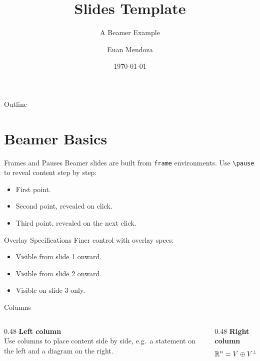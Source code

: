 \documentclass{beamer}
\title{Slides Template}
\subtitle{A Beamer Example}
\author{Euan Mendoza}
\date{\today}
\begin{document}
\begin{frame}
    \titlepage
\end{frame}

\begin{frame}{Outline}
    \tableofcontents
\end{frame}

\section{Beamer Basics}

\begin{frame}{Frames and Pauses}
    Beamer slides are built from \texttt{frame} environments.
    Use \texttt{\textbackslash pause} to reveal content step by step:

    \begin{itemize}
        \item First point.
        \pause
        \item Second point, revealed on click.
        \pause
        \item Third point, revealed on the next click.
    \end{itemize}
\end{frame}

\begin{frame}{Overlay Specifications}
    Finer control with overlay specs:

    \begin{itemize}
        \item<1-> Visible from slide 1 onward.
        \item<2-> Visible from slide 2 onward.
        \item<3> Visible on slide 3 only.
    \end{itemize}

    \vspace{1em}
\end{frame}

\begin{frame}{Columns}
    \begin{columns}[T]
        \begin{column}{0.48\textwidth}
            \textbf{Left column} \\[0.5em]
            Use columns to place content side by side, e.g.\ a statement
            on the left and a diagram on the right.
        \end{column}
        \begin{column}{0.48\textwidth}
            \textbf{Right column} \\[0.5em]
            \[
                \mathbb{R}^{n} = V \oplus V^{\perp}
            \]
        \end{column}
    \end{columns}
\end{frame}
\end{document}
